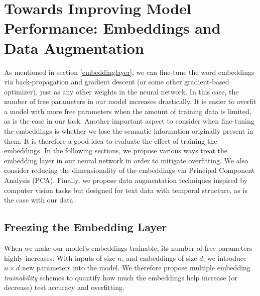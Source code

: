 
\chapter{Towards Improving Model Performance: Embeddings and Data Augmentation}
As mentioned in section \ref{embeddinglayer}, we can fine-tune the word embeddings via back-propagation and gradient descent (or some other
gradient-based optimizer), just as any other weights in the neural network. In this case, the number of free parameters in our model increases drastically.
It is easier to overfit a model with more free parameters when the amount of training data is limited, as is the case in our task. Another important aspect to consider when fine-tuning the embeddings is whether we lose the semantic information originally
present in them. It is therefore a good idea to evaluate the effect of training the embeddings. In the following sections, we propose various ways
treat the embedding layer in our neural network in order to mitigate overfitting. We also consider reducing the dimensionality of the embeddings
via Principal Component Analysis (PCA). Finally, we propose data augmentation techniques inspired by computer vision tasks but designed for
text data with temporal structure, as is the case with our data.

\section{Freezing the Embedding Layer}
When we make our model's embeddings trainable, its number of free parameters highly increases. With inputs of size $n$,
and embeddings of size $d$, we introduce $n \times d$ new parameters into the model.
We therefore propose multiple embedding \textit{trainability} schemes to quantify how much the embeddings help increase (or decrease) test
accuracy and overfitting.

